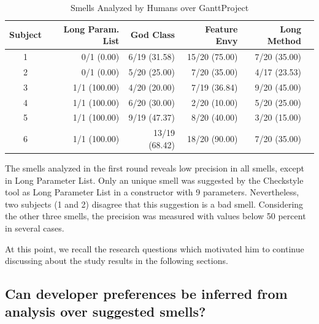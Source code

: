 \documentclass[conference]{IEEEtran}
\begin{document}
\begin{table}[h]
\centering
\caption{Smells Analyzed by Humans over GanttProject}
\label{tab:turn1}
\begin{tabular}{crrrrr}
\hline
Subject & \multicolumn{1}{r}{Long Param. List}       & \multicolumn{1}{r}{God Class}          & \multicolumn{1}{r}{Feature Envy}           & \multicolumn{1}{r}{Long Method}  \\ \hline
1        & \multicolumn{1}{r}{0/1 (0.00)} & \multicolumn{1}{r}{6/19 (31.58)} & \multicolumn{1}{r}{15/20 (75.00)} & 7/20 (35.00)                \\ 
2        & 0/1 (0.00)                      & 5/20 (25.00)                      & 7/20 (35.00)                       & 4/17 (23.53)             \\ 
3        & 1/1 (100.00)                    & 4/20 (20.00)                      & 7/19 (36.84)                       & 9/20 (45.00)             \\ 
4        & 1/1 (100.00)                    & 6/20 (30.00)                      & 2/20 (10.00)                       & 5/20 (25.00)             \\ 
5        & 1/1 (100.00)                    & 9/19 (47.37)                      & 8/20 (40.00)                       & 3/20 (15.00)             \\ 
6        & 1/1 (100.00)                    & 13/19 (68.42)                     & 18/20 (90.00)                      & 7/20 (35.00)             \\ \hline
\end{tabular}
\end{table}

The smells analyzed in the first round reveals low precision in all smells, except in Long Parameter List. Only an unique smell was suggested by the Checkstyle tool as Long Parameter List in a constructor with 9 parameters. Nevertheless, two subjects (1 and 2) disagree that this suggestion is a bad smell. Considering the other three smells, the precision was measured with values below 50 percent in several cases. 

At this point, we recall the research questions which motivated him to continue discussing about the study results in the following sections.

\subsection{Can developer preferences be inferred from analysis over suggested smells?}
\end{document}
